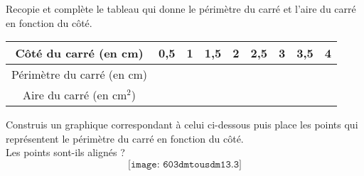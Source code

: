 \begin{myenumerate}
\item Recopie et complète le tableau qui donne le périmètre du carré et l'aire du carré en fonction du côté.
\begin{center}
\begin{tabular}{|c|c|c|c|c|c|c|c|c|}
\hline
Côté du carré (en cm)&0,5&1&1,5&2&2,5&3&3,5&4\\
\hline
Périmètre du carré (en cm)&\phantom{1,5}&\phantom{1,5}&\phantom{1,5}&\phantom{1,5}&\phantom{1,5}&\phantom{1,5}&\phantom{1,5}&\phantom{1,5}\\
\hline
Aire du carré (en cm$^2$)&&&&&&&&\\
\hline
\end{tabular}
\end{center}
\item Construis un graphique correspondant à celui ci-dessous puis
place les points qui représentent le périmètre du carré en fonction du
côté.\\Les points sont-ils alignés ?
\[\texttt{[image: 603dmtousdm13.3]}\]
\end{myenumerate}